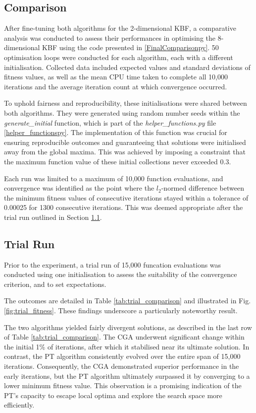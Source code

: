 \documentclass[10pt]{article}
\begin{document}
\begin{multicols}{2}
\section{Comparison}
\label{sec:CGA_QEG_comparison}

After fine-tuning both algorithms for the 2-dimensional KBF, a comparative analysis was conducted to assess their performances in optimising the 8-dimensional KBF using the code presented in \ref{FinalComparisonpy}. 50 optimisation loops were conducted for each algorithm, each with a different initialisation.  Collected data included expected values and standard deviations of fitness values, as well as the mean CPU time taken to complete all 10,000 iterations and the average iteration count at which convergence occurred.

To uphold fairness and reproducibility, these initialisations were shared between both algorithms. They were generated using random number seeds within the \textit{generate\_initial} function, which is part of the \textit{helper\_functions.py} file \ref{helper_functionspy}. The implementation of this function was crucial for ensuring reproducible outcomes and guaranteeing that solutions were initialised away from the global maxima. This was achieved by imposing a constraint that the maximum function value of these initial collections never exceeded 0.3.

Each run was limited to a maximum of 10,000 function evaluations, and convergence was identified as the point where the $l_2$-normed difference between the minimum fitness values of consecutive iterations stayed within a tolerance of 0.00025 for 1300 consecutive iterations. This was deemed appropriate after the trial run outlined in Section \ref{sec:trial}.

\subsection{Trial Run}
\label{sec:trial}

Prior to the experiment, a trial run of 15,000 funcation evaluations was conducted using one initialisation to assess the suitability of the convergence criterion, and to set expectations.

The outcomes are detailed in Table \ref{tab:trial_comparison} and illustrated in Fig. \ref{fig:trial_fitness}. These findings underscore a particularly noteworthy result.

The two algorithms yielded fairly divergent solutions, as described in the last row of Table \ref{tab:trial_comparison}. The CGA underwent significant change within the initial 1\% of iterations, after which it stabilised near its ultimate solution. In contrast, the PT algorithm consistently evolved over the entire span of 15,000 iterations. Consequently, the CGA demonstrated superior performance in the early iterations, but the PT algorithm ultimately surpassed it by converging to a lower minimum fitness value. This observation is a promising indication of the PT's capacity to escape local optima and explore the search space more efficiently.


\end{multicols}
\end{document}
